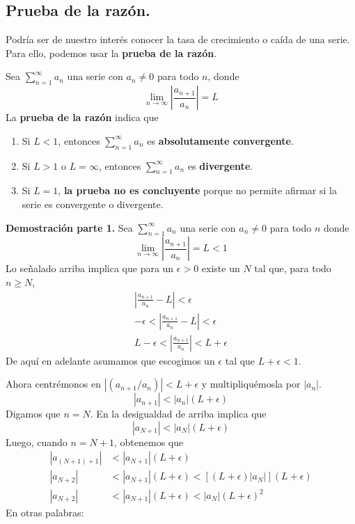 \documentclass[12pt]{article}
\begin{document}
\subsection{Prueba de la razón.}

Podría ser de nuestro interés conocer la tasa de crecimiento o caída de una serie. Para ello, podemos usar la \textbf{prueba de la razón}.

Sea $\sum_{n = 1}^{\infty} a_{n}$ una serie con $a_{n} \neq 0$ para todo $n$, donde
\[
  \lim_{n \to \infty} \left|\frac{a_{n + 1}}{a_{n}}\right| = L
\]
La \textbf{prueba de la razón} indica que

\begin{enumerate}
\item Si $L < 1$, entonces $\sum_{n = 1}^{\infty} a_{n}$ es \textbf{absolutamente convergente}.
\item Si $L > 1$ o $L = \infty$, entonces $\sum_{n = 1}^{\infty} a_{n}$ es \textbf{divergente}.
\item Si $L = 1$, \textbf{la prueba no es concluyente} porque no permite afirmar si la serie es convergente o divergente.
\end{enumerate}

\textbf{Demostración parte 1.} Sea $\sum_{n = 1}^{\infty} a_{n}$ una serie con $a_{n} \neq 0$ para todo $n$ donde
\[
  \lim_{n \to \infty} \left|\frac{a_{n + 1}}{a_{n}}\right| = L < 1
\]
Lo señalado arriba implica que para un $\epsilon > 0$ existe un $N$ tal que, para todo $n \geq N$,
\begin{gather*}
  \left|\frac{a_{n + 1}}{a_{n}} - L \right| < \epsilon \\
  - \epsilon < \left|\frac{a_{n + 1}}{a_{n}} - L \right| < \epsilon \\
  L - \epsilon < \left|\frac{a_{n + 1}}{a_{n}}\right| < L + \epsilon
\end{gather*}
De aquí en adelante asumamos que escogimos un $\epsilon$ tal que $L + \epsilon < 1$.

Ahora centrémonos en $|(a_{n + 1}/a_{n})| < L + \epsilon$ y multipliquémosla por $|a_{n}|$.
\[
  |a_{n + 1}| < |a_{n}| (L + \epsilon) 
\]
Digamos que $n = N$. En la desigualdad de arriba implica que
\[
  |a_{N + 1}| < |a_{N}| (L + \epsilon)
\]
Luego, cuando $n = N + 1$, obtenemos que
\begin{align*}
  |a_{(N + 1) + 1}| &< |a_{N + 1}| (L + \epsilon) \\
        |a_{N + 2}| &< |a_{N + 1}| (L + \epsilon) < [(L + \epsilon) |a_{N}|] (L + \epsilon) \\
        |a_{N + 2}| &< |a_{N + 1}| (L + \epsilon) < |a_{N}| (L + \epsilon)^{2}
\end{align*}
En otras palabras:
\end{document}
